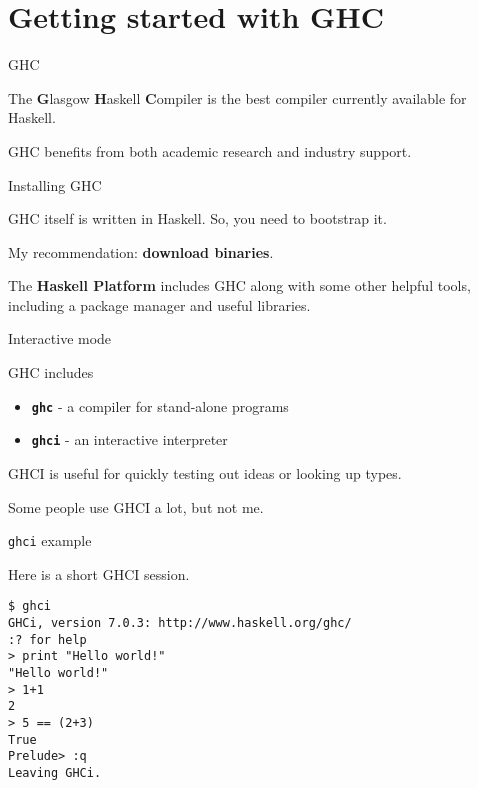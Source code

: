 
\section{Getting started with GHC}

%
\begin{frame}{GHC}

The \textbf{G}lasgow \textbf{H}askell \textbf{C}ompiler is the best compiler
currently available for Haskell.

GHC benefits from both academic research and industry support.

\end{frame}

%
\begin{frame}{Installing GHC}

GHC itself is written in Haskell. So, you need to bootstrap it.

My recommendation: \textbf{download binaries}.

The \textbf{Haskell Platform} includes GHC along with some other helpful tools,
including a package manager and useful libraries.


\end{frame}

%
\begin{frame}{Interactive mode}

GHC includes 

\begin{itemize}
  \item \textbf{\texttt{ghc}} - a compiler for stand-alone programs
  \item \textbf{\texttt{ghci}} - an interactive interpreter
\end{itemize}

GHCI is useful for quickly testing out ideas or looking up types.

Some people use GHCI a lot, but not me.

\end{frame}

%
\begin{frame}[fragile]{\texttt{ghci} example}

Here is a short GHCI session.

\begin{block}{}
\begin{verbatim}
$ ghci
GHCi, version 7.0.3: http://www.haskell.org/ghc/
:? for help
> print "Hello world!"
"Hello world!"
> 1+1
2
> 5 == (2+3)
True
Prelude> :q
Leaving GHCi.
\end{verbatim}
\end{block}

\end{frame}


